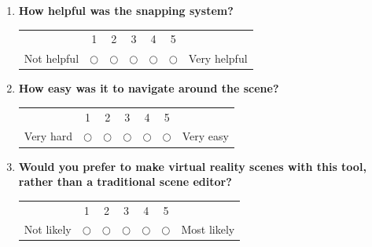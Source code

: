 \documentclass[inscr,ack,preface]{dithesis}
\begin{document}
\begin{appendix}
\begin{enumerate}
    \item \begin{minipage}[t]{\linewidth}
            \textbf{How helpful was the snapping system?}
            \begin{center}
              \small
              \renewcommand{\arraystretch}{1.5}
              \begin{tabular}{ccccccc}
                            & 1          & 2          & 3          & 4          & 5          &              \\
                Not helpful & $\bigcirc$ & $\bigcirc$ & $\bigcirc$ & $\bigcirc$ & $\bigcirc$ & Very helpful
              \end{tabular}
            \end{center}
          \end{minipage}

    \item \begin{minipage}[t]{\linewidth}
            \textbf{How easy was it to navigate around the scene?}
            \begin{center}
              \small
              \renewcommand{\arraystretch}{1.5}
              \begin{tabular}{ccccccc}
                          & 1          & 2          & 3          & 4          & 5          &           \\
                Very hard & $\bigcirc$ & $\bigcirc$ & $\bigcirc$ & $\bigcirc$ & $\bigcirc$ & Very easy
              \end{tabular}
            \end{center}
          \end{minipage}

    \item \begin{minipage}[t]{\linewidth}
            \textbf{Would you prefer to make virtual reality scenes with this tool, rather than a traditional scene editor?}
            \begin{center}
              \small
              \renewcommand{\arraystretch}{1.5}
              \begin{tabular}{ccccccc}
                           & 1          & 2          & 3          & 4          & 5          &             \\
                Not likely & $\bigcirc$ & $\bigcirc$ & $\bigcirc$ & $\bigcirc$ & $\bigcirc$ & Most likely
              \end{tabular}
            \end{center}
          \end{minipage}
  \end{enumerate}

\end{appendix}


{\footnotesize }

\end{document}
